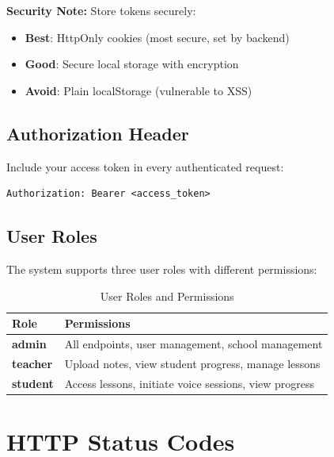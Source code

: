\documentclass[12pt,a4paper,oneside]{article}
\begin{document}
\begin{tcolorbox}[colback=lightgreen, colframe=darkblue]
\textbf{Security Note:} Store tokens securely:
\begin{itemize}
    \item \textbf{Best}: HttpOnly cookies (most secure, set by backend)
    \item \textbf{Good}: Secure local storage with encryption
    \item \textbf{Avoid}: Plain localStorage (vulnerable to XSS)
\end{itemize}
\end{tcolorbox}

\subsection{Authorization Header}

Include your access token in every authenticated request:

\begin{lstlisting}
Authorization: Bearer <access_token>
\end{lstlisting}

\subsection{User Roles}

The system supports three user roles with different permissions:

\begin{table}[H]
\centering
\small
\begin{tabular}{|l|l|}
\hline
\textbf{Role} & \textbf{Permissions} \\
\hline
\textbf{admin} & All endpoints, user management, school management \\
\hline
\textbf{teacher} & Upload notes, view student progress, manage lessons \\
\hline
\textbf{student} & Access lessons, initiate voice sessions, view progress \\
\hline
\end{tabular}
\caption{User Roles and Permissions}
\end{table}

\newpage

\section{HTTP Status Codes}
\end{document}
